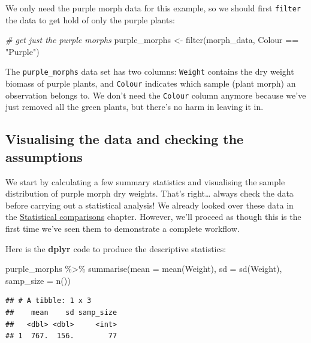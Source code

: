 \documentclass[
]{book}
\newenvironment{Shaded}{\begin{snugshade}}{\end{snugshade}}
\newcommand{\AttributeTok}[1]{\textcolor[rgb]{0.77,0.63,0.00}{#1}}
\newcommand{\CommentTok}[1]{\textcolor[rgb]{0.56,0.35,0.01}{\textit{#1}}}
\newcommand{\FunctionTok}[1]{\textcolor[rgb]{0.00,0.00,0.00}{#1}}
\newcommand{\NormalTok}[1]{#1}
\newcommand{\OtherTok}[1]{\textcolor[rgb]{0.56,0.35,0.01}{#1}}
\newcommand{\SpecialCharTok}[1]{\textcolor[rgb]{0.00,0.00,0.00}{#1}}
\newcommand{\StringTok}[1]{\textcolor[rgb]{0.31,0.60,0.02}{#1}}
\begin{document}
We only need the purple morph data for this example, so we should first \texttt{filter} the data to get hold of only the purple plants:

\begin{Shaded}
\begin{Highlighting}[]
\CommentTok{\# get just the purple morphs}
\NormalTok{purple\_morphs }\OtherTok{\textless{}{-}} \FunctionTok{filter}\NormalTok{(morph\_data, Colour }\SpecialCharTok{==} \StringTok{"Purple"}\NormalTok{)}
\end{Highlighting}
\end{Shaded}

The \texttt{purple\_morphs} data set has two columns: \texttt{Weight} contains the dry weight biomass of purple plants, and \texttt{Colour} indicates which sample (plant morph) an observation belongs to. We don't need the \texttt{Colour} column anymore because we've just removed all the green plants, but there's no harm in leaving it in.

\hypertarget{visualising-the-data-and-checking-the-assumptions}{%
\subsection{Visualising the data and checking the assumptions}\label{visualising-the-data-and-checking-the-assumptions}}

We start by calculating a few summary statistics and visualising the sample distribution of purple morph dry weights. That's right\ldots{} always check the data before carrying out a statistical analysis! We already looked over these data in the \protect\hyperlink{statistical-comparisons}{Statistical comparisons} chapter. However, we'll proceed as though this is the first time we've seen them to demonstrate a complete workflow.

Here is the \textbf{dplyr} code to produce the descriptive statistics:

\begin{Shaded}
\begin{Highlighting}[]
\NormalTok{purple\_morphs }\SpecialCharTok{\%\textgreater{}\%} 
  \FunctionTok{summarise}\NormalTok{(}\AttributeTok{mean =} \FunctionTok{mean}\NormalTok{(Weight), }
            \AttributeTok{sd =} \FunctionTok{sd}\NormalTok{(Weight),}
            \AttributeTok{samp\_size =} \FunctionTok{n}\NormalTok{())}
\end{Highlighting}
\end{Shaded}

\begin{verbatim}
## # A tibble: 1 x 3
##    mean    sd samp_size
##   <dbl> <dbl>     <int>
## 1  767.  156.        77
\end{verbatim}
\end{document}
